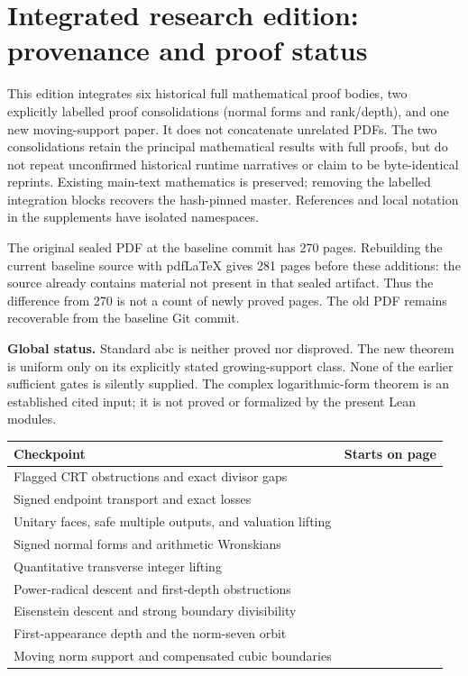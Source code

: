 \clearpage
\section{Integrated research edition: provenance and proof status}
\label{sec:integration-20260906}
This edition integrates six historical full mathematical proof bodies, two
explicitly labelled proof consolidations (normal forms and rank/depth), and
one new moving-support paper. It does not concatenate unrelated PDFs.
The two consolidations retain the principal mathematical results with full
proofs, but do not repeat unconfirmed historical runtime narratives or claim
to be byte-identical reprints. Existing main-text mathematics is preserved;
removing the labelled integration blocks recovers the hash-pinned master.
References and local notation in the supplements have isolated namespaces.

The original sealed PDF at the baseline commit has 270 pages. Rebuilding the
current baseline source with pdfLaTeX gives 281 pages before these additions:
the source already contains material not present in that sealed artifact.
Thus the difference from 270 is not a count of newly proved pages. The old
PDF remains recoverable from the baseline Git commit.

\textbf{Global status.} Standard abc is neither proved nor disproved.
The new theorem is uniform only on its explicitly stated growing-support
class. None of the earlier sufficient gates is silently supplied.
The complex logarithmic-form theorem is an established cited input; it is
not proved or formalized by the present Lean modules.

\begin{center}\small
\begin{tabular}{p{}r}
\toprule Checkpoint & Starts on page\\\midrule
Flagged CRT obstructions and exact divisor gaps & \pageref{checkpoint:fcrt}\\
Signed endpoint transport and exact losses & \pageref{checkpoint:signed}\\
Unitary faces, safe multiple outputs, and valuation lifting & \pageref{checkpoint:multiflag}\\
Signed normal forms and arithmetic Wronskians & \pageref{checkpoint:normal}\\
Quantitative transverse integer lifting & \pageref{checkpoint:transverse}\\
Power-radical descent and first-depth obstructions & \pageref{checkpoint:power}\\
Eisenstein descent and strong boundary divisibility & \pageref{checkpoint:eisenstein}\\
First-appearance depth and the norm-seven orbit & \pageref{checkpoint:rank}\\
Moving norm support and compensated cubic boundaries & \pageref{checkpoint:moving}\\
\bottomrule
\end{tabular}
\end{center}

